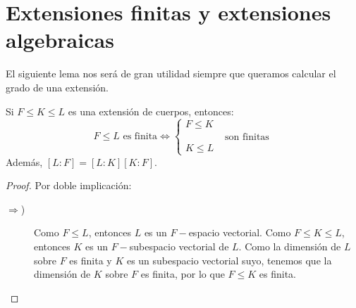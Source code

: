 \section{Extensiones finitas y extensiones algebraicas}
\noindent
El siguiente lema nos será de gran utilidad siempre que queramos calcular el grado de una extensión.

\begin{lema}[de la Torre]
    Si $F\leq K \leq L$ es una extensión de cuerpos, entonces:
    \begin{equation*}
        F\leq L \text{\ es finita} \Longleftrightarrow \left\{\begin{array}{l}
            F\leq K \\
            \qquad \qquad \text{son finitas} \\
            K \leq L 
        \end{array}\right.
    \end{equation*}
    Además, $[L:F] = [L:K][K:F]$.
    \begin{proof}
        Por doble implicación:
        \begin{description}
            \item [$\Longrightarrow$)] Como $F\leq L$, entonces $L$ es un $F-$espacio vectorial. Como $F\leq K\leq L$, entonces $K$ es un $F-$subespacio vectorial de $L$. Como la dimensión de $L$ sobre $F$ es finita y $K$ es un subespacio vectorial suyo, tenemos que la dimensión de $K$ sobre $F$ es finita, por lo que $F\leq K$ es finita.
            

\end{description}
\end{proof}
\end{lema}
